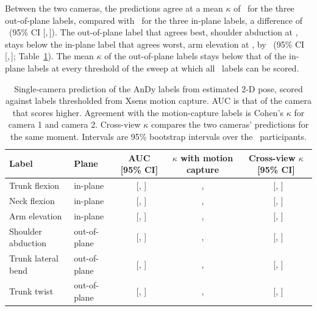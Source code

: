 \documentclass[review,3p,authoryear]{elsarticle}
\begin{document}
Between the two cameras, the predictions agree at a mean $\kappa$ of \andyAdjOutOfPlane\
for the three out-of-plane labels, compared with \andyAdjInPlane\ for the three in-plane
labels, a difference of \andyGapMean\ (95\% CI [\andyGapMeanCiLo,\,\andyGapMeanCiHi]).
The out-of-plane label that agrees best, shoulder abduction at \andyAdjMaxOutOfPlane,
stays below the in-plane label that agrees worst, arm elevation at \andyAdjMinInPlane, by
\andyGapMin\ (95\% CI [\andyGapMinCiLo,\,\andyGapMinCiHi]; Table~\ref{tab:external}). The
mean $\kappa$ of the out-of-plane labels stays below that of the in-plane labels at every
threshold of the sweep at which all \andyNLabels\ labels can be scored.

\begin{table}[t]
\centering
\caption{Single-camera prediction of the AnDy labels from estimated 2-D pose, scored
against labels thresholded from Xsens motion capture. AUC is that of the camera that scores
higher. Agreement with the motion-capture labels is Cohen's $\kappa$ for camera 1 and camera
2. Cross-view $\kappa$ compares the two cameras' predictions for the same moment. Intervals
are 95\% bootstrap intervals over the \andyParticipants\ participants.}
\label{tab:external}
\small
\begin{tabular}{llccc}
\toprule
Label & Plane & AUC [95\% CI] & $\kappa$ with motion capture & Cross-view $\kappa$ [95\% CI] \\
\midrule
Trunk flexion & in-plane & \andyAucTrunkFlexion\ [\andyAucCiLoTrunkFlexion, \andyAucCiHiTrunkFlexion] & \andyFidKappaOneTrunkFlexion, \andyFidKappaTwoTrunkFlexion & \andyXviewKappaTrunkFlexion\ [\andyXviewKappaCiLoTrunkFlexion, \andyXviewKappaCiHiTrunkFlexion] \\
Neck flexion & in-plane & \andyAucNeckFlexion\ [\andyAucCiLoNeckFlexion, \andyAucCiHiNeckFlexion] & \andyFidKappaOneNeckFlexion, \andyFidKappaTwoNeckFlexion & \andyXviewKappaNeckFlexion\ [\andyXviewKappaCiLoNeckFlexion, \andyXviewKappaCiHiNeckFlexion] \\
Arm elevation & in-plane & \andyAucArmElev\ [\andyAucCiLoArmElev, \andyAucCiHiArmElev] & \andyFidKappaOneArmElev, \andyFidKappaTwoArmElev & \andyXviewKappaArmElev\ [\andyXviewKappaCiLoArmElev, \andyXviewKappaCiHiArmElev] \\
Shoulder abduction & out-of-plane & \andyAucArmAbd\ [\andyAucCiLoArmAbd, \andyAucCiHiArmAbd] & \andyFidKappaOneArmAbd, \andyFidKappaTwoArmAbd & \andyXviewKappaArmAbd\ [\andyXviewKappaCiLoArmAbd, \andyXviewKappaCiHiArmAbd] \\
Trunk lateral bend & out-of-plane & \andyAucTrunkLateral\ [\andyAucCiLoTrunkLateral, \andyAucCiHiTrunkLateral] & \andyFidKappaOneTrunkLateral, \andyFidKappaTwoTrunkLateral & \andyXviewKappaTrunkLateral\ [\andyXviewKappaCiLoTrunkLateral, \andyXviewKappaCiHiTrunkLateral] \\
Trunk twist & out-of-plane & \andyAucTrunkTwist\ [\andyAucCiLoTrunkTwist, \andyAucCiHiTrunkTwist] & \andyFidKappaOneTrunkTwist, \andyFidKappaTwoTrunkTwist & \andyXviewKappaTrunkTwist\ [\andyXviewKappaCiLoTrunkTwist, \andyXviewKappaCiHiTrunkTwist] \\
\bottomrule
\end{tabular}
\end{table}
\end{document}
